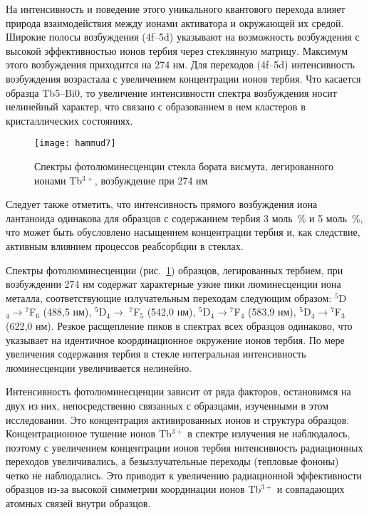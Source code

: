 \documentclass[press]{vestnik}
\begin{document}
На интенсивность и поведение этого уникального квантового перехода влияет 
природа взаимодействия между ионами активатора и окружающей их средой. 
Широкие полосы возбуждения (4f--5d) указывают на возможность возбуждения с 
высокой эффективностью ионов тербия через стеклянную матрицу. Максимум этого 
возбуждения приходится на 274 нм. Для переходов (4f--5d) интенсивность 
возбуждения возрастала с увеличением концентрации ионов тербия. Что касается 
образца Tb5--Bi0, то увеличение интенсивности спектра возбуждения носит 
нелинейный характер, что связано с образованием в нем кластеров в 
кристаллических состояниях.

\begin{figure}[b!]
\centerline{\texttt{[image: hammud7]}}
\caption{Спектры фотолюминесценции стекла бората висмута, легированного 
ионами Tb$^{3+}$, возбуждение при 274 нм}
\label{fig7}
\end{figure}

Следует также отметить, что интенсивность прямого возбуждения иона 
лантаноида одинакова для образцов с содержанием тербия 3 моль~{\%} и 5 
моль~{\%}, что может быть обусловлено насыщением концентрации тербия и, как 
следствие, активным влиянием процессов реабсорбции в стеклах.

Спектры фотолюминесценции (рис.~\ref{fig7}) образцов, легированных тербием, при 
возбуждении 274 нм содержат характерные узкие пики люминесценции иона 
металла, соответствующие излучательным переходам следующим образом: 
$^{5}$D$_{4} \to {}^{7}$F$_{6}$ (488,5 нм), $^{5}$D$_{4} \to $ 
$^{7}$F$_{5}$ (542,0 нм), $^{5}$D$_{4} \to {}^{7}$F$_{4}$ (583,9 нм), 
$^{5}$D$_{4} \to {}^{7}$F$_{3}$ (622,0 нм). Резкое расщепление пиков в 
спектрах всех образцов одинаково, что указывает на идентичное 
координационное окружение ионов тербия. По мере увеличения содержания тербия 
в стекле интегральная интенсивность люминесценции увеличивается нелинейно.

Интенсивность фотолюминесценции зависит от ряда факторов, остановимся на 
двух из них, непосредственно связанных с образцами, изученными в этом 
исследовании. Это концентрация активированных ионов и структура образцов. 
Концентрационное тушение ионов Tb$^{3+}$ в спектре излучения не наблюдалось, 
поэтому с увеличением концентрации ионов тербия интенсивность радиационных 
переходов увеличивались, а безызлучательные переходы (тепловые фононы) четко 
не наблюдались. Это приводит к увеличению радиационной эффективности 
образцов из-за высокой симметрии координации ионов Tb$^{3+}$ и совпадающих 
атомных связей внутри образцов.
\end{document}

